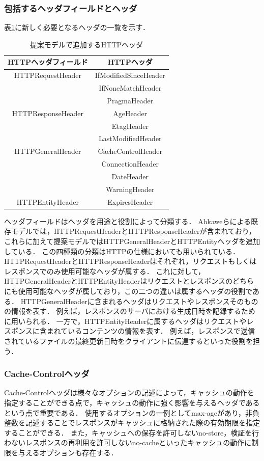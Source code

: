 \documentclass{css}
\begin{document}
\subsubsection{包括するヘッダフィールドとヘッダ}
表\ref{tb:model_header}に新しく必要となるヘッダの一覧を示す．

\begin{table}[htb]
\centering
\caption{提案モデルで追加するHTTPヘッダ}
\label{tb:model_header}
\begin{tabular}{c|c}
\hline
HTTPヘッダフィールド & HTTPヘッダ \\ \hline \hline
HTTPRequestHeader & IfModifiedSinceHeader \\
 & IfNoneMatchHeader \\
 & PragmaHeader \\ \hline
HTTPResponseHeader & AgeHeader \\
　& EtagHeader \\
 & LastModifiedHeader \\ \hline
HTTPGeneralHeader & CacheControlHeader \\
 & ConnectionHeader \\
 & DateHeader \\
 & WarningHeader \\ \hline
HTTPEntityHeader & ExpiresHeader \\ \hline
\end{tabular}
\end{table}

ヘッダフィールドはヘッダを用途と役割によって分類する．
Ahkaweらによる既存モデル\cite{webmodel}では，HTTPRequestHeaderとHTTPResponseHeaderが含まれており，これらに加えて提案モデルではHTTPGeneralHeaderとHTTPEntityヘッダを追加している．
この四種類の分類はHTTPの仕様においても用いられている．
HTTPRequestHeaderとHTTPResponseHeaderはそれぞれ，リクエストもしくはレスポンスでのみ使用可能なヘッダが属する．
これに対して，HTTPGeneralHeaderとHTTPEntityHeaderはリクエストとレスポンスのどちらにも使用可能なヘッダが属しており，この二つの違いは属するヘッダの役割である．
HTTPGeneralHeaderに含まれるヘッダはリクエストやレスポンスそのものの情報を表す．
例えば，レスポンスのサーバにおける生成日時を記録するために用いられる．
一方で，HTTPEntityHeaderに属するヘッダはリクエストやレスポンスに含まれているコンテンツの情報を表す．
例えば，レスポンスで送信されているファイルの最終更新日時をクライアントに伝達するといった役割を担う．

\subsubsection{Cache-Controlヘッダ}
Cache-Controlヘッダは様々なオプションの記述によって，キャッシュの動作を指定することができる点で，キャッシュの動作に強く影響を与えるヘッダであるという点で重要である．
使用するオプションの一例としてmax-ageがあり，非負整数を記述することでレスポンスがキャッシュに格納された際の有効期限を指定することができる．
また，キャッシュへの保存を許可しないno-store，検証を行わないレスポンスの再利用を許可しないno-cacheといったキャッシュの動作に制限を与えるオプションも存在する．
\end{document}
